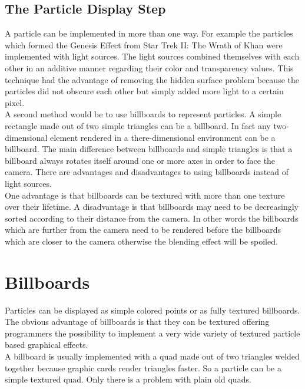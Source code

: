 \newpage
\subsection{The Particle Display Step}
A particle can be implemented in more than one way. For example the particles which formed the Genesis Effect from Star Trek II: The Wrath of Khan were implemented with light sources. The light sources combined themselves with each other in an additive manner regarding their color and transparency values. This technique had the advantage of removing the hidden surface problem because the particles did not obscure each other but simply added more light to a certain pixel.\\

A second method would be to use billboards to represent particles. A simple rectangle made out of two simple triangles can be a billboard. In fact any two-dimensional element rendered in a there-dimensional environment can be a billboard. The main difference between billboards and simple triangles is that a billboard always rotates itself around one or more axes in order to face the camera. There are advantages and disadvantages to using billboards instead of light sources.\\

One advantage is that billboards can be textured with more than one texture over their lifetime. A disadvantage is that billboards may need to be decreasingly sorted according to their distance from the camera. In other words the billboards which are further from the camera need to be rendered before the billboards which are closer to the camera otherwise the blending effect will be spoiled.\\

\newpage
\section{Billboards}
Particles can be displayed as simple colored points or as fully textured billboards. The obvious advantage of billboards is that they can be textured offering programmers the possibility to implement a very wide variety of textured particle based graphical effects.\\

A billboard is usually implemented with a quad made out of two triangles welded together because graphic cards render triangles faster. So a particle can be a simple textured quad. Only there is a problem with plain old quads.\\

